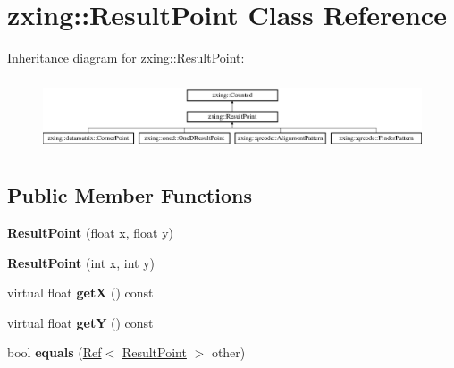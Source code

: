 \hypertarget{classzxing_1_1_result_point}{}\section{zxing\+:\+:Result\+Point Class Reference}
\label{classzxing_1_1_result_point}
Inheritance diagram for zxing\+:\+:Result\+Point\+:\begin{figure}[H]
\begin{center}
\leavevmode
\includegraphics[height=2.153846cm]{classzxing_1_1_result_point}
\end{center}
\end{figure}
\subsection*{Public Member Functions}
\begin{DoxyCompactItemize}
\item 
\mbox{\label{classzxing_1_1_result_point_a847369b564566eb382aecdb328a3759c}} 
{\bfseries Result\+Point} (float x, float y)
\item 
\mbox{\label{classzxing_1_1_result_point_aeb720f2bd33199476ea70ee1615fdba4}} 
{\bfseries Result\+Point} (int x, int y)
\item 
\mbox{\label{classzxing_1_1_result_point_aad1fd762a8b3f8592db88366b2de4340}} 
virtual float {\bfseries getX} () const
\item 
\mbox{\label{classzxing_1_1_result_point_ac3dc569a581a51ab68cd9c9ab5ec0f30}} 
virtual float {\bfseries getY} () const
\item 
\mbox{\label{classzxing_1_1_result_point_a98f9b79a9e80073438950d02e56e076c}} 
bool {\bfseries equals} (\mbox{\hyperlink{classzxing_1_1_ref}{Ref}}$<$ \mbox{\hyperlink{classzxing_1_1_result_point}{Result\+Point}} $>$ other)
\end{DoxyCompactItemize}
